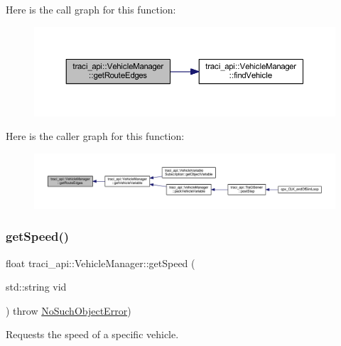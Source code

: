 Here is the call graph for this function\+:
\nopagebreak
\begin{figure}[H]
\begin{center}
\leavevmode
\includegraphics[width=350pt]{classtraci__api_1_1_vehicle_manager_a399053f44944093adf9a00536bf86bba_cgraph}
\end{center}
\end{figure}
Here is the caller graph for this function\+:
\nopagebreak
\begin{figure}[H]
\begin{center}
\leavevmode
\includegraphics[width=350pt]{classtraci__api_1_1_vehicle_manager_a399053f44944093adf9a00536bf86bba_icgraph}
\end{center}
\end{figure}
\mbox{\label{classtraci__api_1_1_vehicle_manager_aa5f5a8c13bdd6b1407da5b5ffb6a8559}} 
\subsubsection{\texorpdfstring{get\+Speed()}{getSpeed()}}
{\footnotesize\ttfamily float traci\+\_\+api\+::\+Vehicle\+Manager\+::get\+Speed (\begin{DoxyParamCaption}\item[{std\+::string}]{vid }\end{DoxyParamCaption}) throw  \hyperlink{classtraci__api_1_1_no_such_object_error}{No\+Such\+Object\+Error}) }



Requests the speed of a specific vehicle. 


